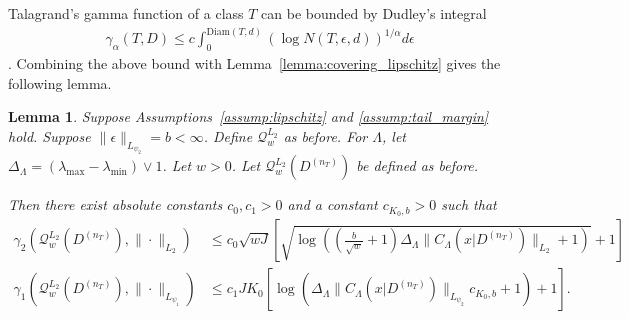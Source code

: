 \documentclass[10pt]{book}
\newtheorem{lemma}{Lemma}
\theoremstyle{definition}
\begin{document}
Talagrand's gamma function of a class $T$ can be bounded by Dudley's integral
\begin{align}
\gamma_{\alpha}(T,D)\le c\int_{0}^{\text{Diam}(T,d)}\left(\log N(T,\epsilon,d)\right)^{1/\alpha}d\epsilon
\label{eq:bound_gamma}
\end{align}
\citep{talagrand2006generic}.
Combining the above bound with Lemma~\ref{lemma:covering_lipschitz} gives the following lemma.

\begin{lemma}
Suppose Assumptions~\ref{assump:lipschitz} and \ref{assump:tail_margin} hold.
Suppose $\|\epsilon\|_{L_{\psi_2}} = b < \infty$.
Define $\mathcal{Q}_w^{L_2}$ as before.
For $\Lambda$, let $\Delta_{\Lambda}=(\lambda_{\max}-\lambda_{\min}) \vee 1$.
Let $w>0$.
Let $\mathcal{Q}_{w}^{L_{2}}(D^{(n_{T})})$ be defined as before.

Then there exist absolute constants $c_0, c_1 >0$ and a constant $c_{K_0, b} > 0$ such that
\begin{align}
\gamma_{2}\left(\mathcal{Q}_{w}^{L_{2}}(D^{(n_{T})}),\|\cdot\|_{L_{2}}\right)
& \le	c_0 \sqrt{w J}
\left[\sqrt{
\log\left(
\left (\frac{b}{\sqrt{w}} + 1 \right )
\Delta_{\Lambda}\|C_\Lambda(x|D^{(n_{T})})\|_{L_{2}} + 1
\right)
}
+1\right]\\
\gamma_{1}\left(\mathcal{Q}_{w}^{L_{2}}(D^{(n_{T})}),\|\cdot\|_{L_{\psi_{1}}}\right)
& \le c_{1}JK_0\left[
\log\left(
	\Delta_{\Lambda}\|C_\Lambda(x|D^{(n_{T})})\|_{L_{\psi_{2}}} c_{K_0, b} +1
\right)
+1\right].
\end{align}
\end{lemma}
\end{document}
